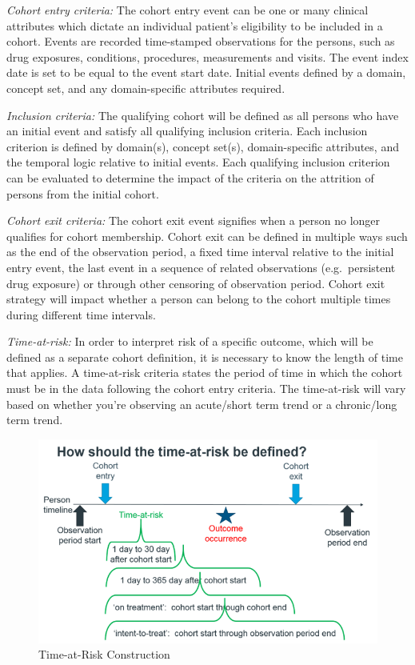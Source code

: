\documentclass[11pt]{book}
\theoremstyle{definition}
\theoremstyle{definition}
\theoremstyle{definition}
\theoremstyle{remark}
\begin{document}
\emph{Cohort entry criteria:} The cohort entry event can be one or many clinical attributes which dictate an individual patient's eligibility to be included in a cohort. Events are recorded time-stamped observations for the persons, such as drug exposures, conditions, procedures, measurements and visits. The event index date is set to be equal to the event start date. Initial events defined by a domain, concept set, and any domain-specific attributes required.

\emph{Inclusion criteria:} The qualifying cohort will be defined as all persons who have an initial event and satisfy all qualifying inclusion criteria. Each inclusion criterion is defined by domain(s), concept set(s), domain-specific attributes, and the temporal logic relative to initial events. Each qualifying inclusion criterion can be evaluated to determine the impact of the criteria on the attrition of persons from the initial cohort.

\emph{Cohort exit criteria:} The cohort exit event signifies when a person no longer qualifies for cohort membership. Cohort exit can be defined in multiple ways such as the end of the observation period, a fixed time interval relative to the initial entry event, the last event in a sequence of related observations (e.g.~persistent drug exposure) or through other censoring of observation period. Cohort exit strategy will impact whether a person can belong to the cohort multiple times during different time intervals.

\emph{Time-at-risk:} In order to interpret risk of a specific outcome, which will be defined as a separate cohort definition, it is necessary to know the length of time that applies. A time-at-risk criteria states the period of time in which the cohort must be in the data following the cohort entry criteria. The time-at-risk will vary based on whether you're observing an acute/short term trend or a chronic/long term trend.

\begin{figure}
\includegraphics[width=1\linewidth]{images/Cohorts/cohort-TAR} \caption{Time-at-Risk Construction}\label{fig:cohortTar}
\end{figure}
\end{document}
